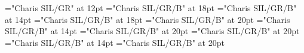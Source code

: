 \documentclass[a4paper]{article}
\begin{document}
\pagestyle{plain}
\sloppy
\setlength{\parfillskip}{0pt plus 1fil}
\font\scrBookscrBody="Charis SIL/GR" at 12pt
\font\TitleMainscrBookscrBody="Charis SIL/GR/B" at 18pt
\font\TitleSecondarynkoTitleMainscrBookscrBody="Charis SIL/GR/B" at 14pt
\font\spannkoTitleMainscrBookscrBody="Charis SIL/GR/B" at 18pt
\font\TitleMainNonescrBookscrBody="Charis SIL/GR/B" at 20pt
\font\TitleSecondarynkoTitleMainNonescrBookscrBody="Charis SIL/GR/B" at 14pt
\font\spannkoTitleMainNonescrBookscrBody="Charis SIL/GR/B" at 20pt
\font\TitleMainNormalscrBookscrBody="Charis SIL/GR/B" at 20pt
\font\TitleSecondarynkoTitleMainNormalscrBookscrBody="Charis SIL/GR/B" at 14pt
\font\spannkoTitleMainNormalscrBookscrBody="Charis SIL/GR/B" at 20pt

\mbox{} 
\newpage 
\newpage 
\setcounter{page}{1} 
\pagestyle{fancy} 
\begin{spacing}{1}\begin{center}


\end{center}\end{spacing}\begin{center}


\end{center}\begin{spacing}{1.5}\begin{center}


\end{center}\end{spacing}
\end{document}
